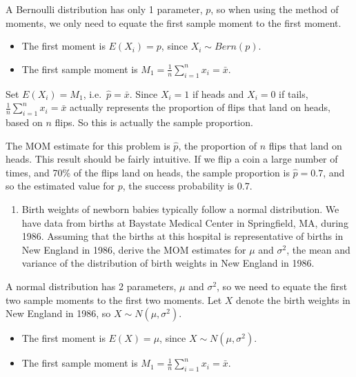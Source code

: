 \documentclass[
]{book}
\providecommand{\tightlist}{%
  \setlength{\itemsep}{0pt}\setlength{\parskip}{0pt}}
\begin{document}
A Bernoulli distribution has only 1 parameter, \(p\), so when using the method of moments, we only need to equate the first sample moment to the first moment.

\begin{itemize}
\tightlist
\item
  The first moment is \(E(X_i) = p\), since \(X_i \sim Bern(p)\).
\item
  The first sample moment is \(M_1 = \frac{1}{n} \sum_{i=1}^n x_i = \bar{x}\).
\end{itemize}

Set \(E(X_i) = M_1\), i.e.~\(\hat{p} = \bar{x}\). Since \(X_i = 1\) if heads and \(X_i = 0\) if tails, \(\frac{1}{n} \sum_{i=1}^n x_i = \bar{x}\) actually represents the proportion of flips that land on heads, based on \(n\) flips. So this is actually the sample proportion.

The MOM estimate for this problem is \(\hat{p}\), the proportion of \(n\) flips that land on heads. This result should be fairly intuitive. If we flip a coin a large number of times, and 70\% of the flips land on heads, the sample proportion is \(\hat{p} = 0.7\), and so the estimated value for \(p\), the success probability is 0.7.

\begin{enumerate}
\def\labelenumi{\arabic{enumi}.}
\setcounter{enumi}{1}
\tightlist
\item
  Birth weights of newborn babies typically follow a normal distribution. We have data from births at Baystate Medical Center in Springfield, MA, during 1986. Assuming that the births at this hospital is representative of births in New England in 1986, derive the MOM estimates for \(\mu\) and \(\sigma^2\), the mean and variance of the distribution of birth weights in New England in 1986.
\end{enumerate}

A normal distribution has 2 parameters, \(\mu\) and \(\sigma^2\), so we need to equate the first two sample moments to the first two moments. Let \(X\) denote the birth weights in New England in 1986, so \(X \sim N(\mu, \sigma^2)\).

\begin{itemize}
\tightlist
\item
  The first moment is \(E(X) = \mu\), since \(X \sim N(\mu, \sigma^2)\).
\item
  The first sample moment is \(M_1 = \frac{1}{n} \sum_{i=1}^n x_i = \bar{x}\).
\end{itemize}
\end{document}
